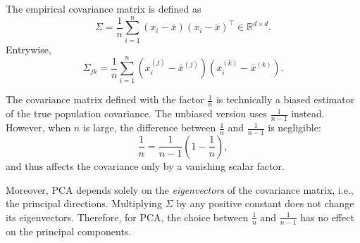 \documentclass[../main]{subfiles}
\begin{document}
    The empirical covariance matrix is defined as
    \begin{equation}
        \Sigma = \frac{1}{n}\sum_{i=1}^n (x_i - \bar{x})(x_i - \bar{x})^{\top}
        \in \mathbb{R}^{d\times d}.
    \end{equation}
    Entrywise,  
    \begin{equation}
        \Sigma_{jk}
        = \frac{1}{n}\sum_{i=1}^n 
        (x_i^{(j)} - \bar{x}^{(j)})(x_i^{(k)} - \bar{x}^{(k)}).
    \end{equation}
    \begin{remark}
        The covariance matrix defined with the factor $\tfrac{1}{n}$ is technically a biased estimator of the true population covariance.  
        The unbiased version uses $\tfrac{1}{n-1}$ instead.  
        However, when $n$ is large, the difference between $\tfrac{1}{n}$ and $\tfrac{1}{n-1}$ is negligible:
        \begin{equation}
            \frac{1}{n} = \frac{1}{n-1} \left( 1 - \frac{1}{n} \right),
        \end{equation}
        and thus affects the covariance only by a vanishing scalar factor.
        
        Moreover, PCA depends solely on the \emph{eigenvectors} of the covariance matrix, i.e., the principal directions.  
        Multiplying $\Sigma$ by any positive constant does not change its eigenvectors.  
        Therefore, for PCA, the choice between $\tfrac{1}{n}$ and $\tfrac{1}{n-1}$ has no effect on the principal components.
        \end{remark}
\end{document}
